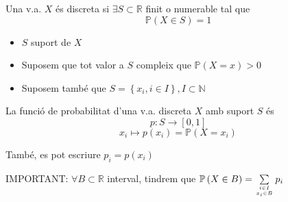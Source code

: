 \documentclass[../main.tex]{subfiles}
\begin{document}
    \begin{definicio}
        Una v.a. $X$ és discreta si $\exists S \subset \mathbb{R}$ finit o numerable tal que 
        \begin{displaymath}
            \mathbb{P}\left(X \in S\right) = 1
        \end{displaymath}
        \begin{itemize}
            \item $S$ suport de $X$
            \item Suposem que tot valor a $S$ compleix que $\mathbb{P}\left(X = x\right) > 0$
            \item Suposem també que $S = \left\{x_i, i\in I\right\}, I \subset \mathbb{N}$ 
        \end{itemize}
        \begin{definicio}
            La funció de probabilitat d'una v.a. discreta $X$ amb suport $S$ és
            \begin{displaymath}
                p: S \to \left[0, 1\right]
            \end{displaymath}
            \begin{displaymath}
                x_i \longmapsto p\left(x_i\right)  = \mathbb{P} \left(X = x_i\right)  
            \end{displaymath}
        \end{definicio}
    \end{definicio}
    \begin{notacio}
        També, es pot escriure $p_i = p\left(x_i\right)$
    \end{notacio}
    \begin{obs}
        IMPORTANT: $\forall B \subset \mathbb{R}$ interval, tindrem que $\mathbb{P}\left(X \in B\right) = \sum\limits_{i \in I\atop x_i \in B} p_i$
    \end{obs}
\end{document}
